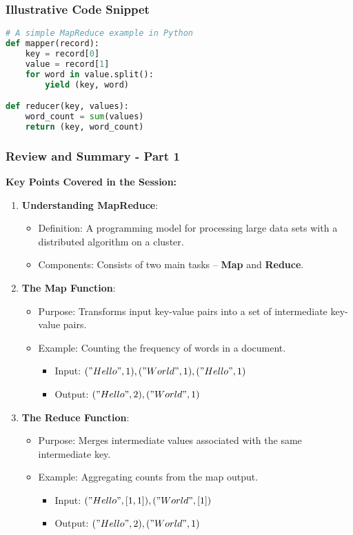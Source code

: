\documentclass[aspectratio=169]{beamer}
\begin{document}
\begin{frame}[fragile]
    \frametitle{Illustrative Code Snippet}
    \begin{lstlisting}[language=Python]
# A simple MapReduce example in Python
def mapper(record):
    key = record[0]
    value = record[1]
    for word in value.split():
        yield (key, word)

def reducer(key, values):
    word_count = sum(values)
    return (key, word_count)
    \end{lstlisting}
\end{frame}

\begin{frame}[fragile]
    \frametitle{Review and Summary - Part 1}
    \textbf{Key Points Covered in the Session:}
    \begin{enumerate}
        \item \textbf{Understanding MapReduce}:
        \begin{itemize}
            \item Definition: A programming model for processing large data sets with a distributed algorithm on a cluster.
            \item Components: Consists of two main tasks – \textbf{Map} and \textbf{Reduce}.
        \end{itemize}
        
        \item \textbf{The Map Function}:
        \begin{itemize}
            \item Purpose: Transforms input key-value pairs into a set of intermediate key-value pairs.
            \item Example: Counting the frequency of words in a document.
                \begin{itemize}
                    \item Input: $("Hello", 1), ("World", 1), ("Hello", 1)$
                    \item Output: $("Hello", 2), ("World", 1)$
                \end{itemize}
        \end{itemize}
        
        \item \textbf{The Reduce Function}:
        \begin{itemize}
            \item Purpose: Merges intermediate values associated with the same intermediate key.
            \item Example: Aggregating counts from the map output.
                \begin{itemize}
                    \item Input: $("Hello", [1, 1]), ("World", [1])$
                    \item Output: $("Hello", 2), ("World", 1)$
                \end{itemize}
        \end{itemize}
    \end{enumerate}
\end{frame}
\end{document}
